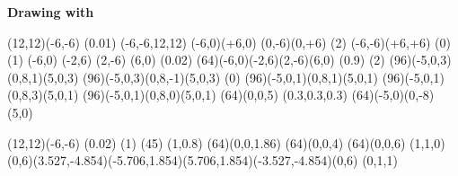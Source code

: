 



\begin{center}
{\Huge \bf{Drawing with \Lapdf}}
\bigskip

\begin{lapdf}(12,12)(-6,-6)
 \Setwidth(0.01)
 \Rect(-6,-6,12,12)
 \Line(-6,0)(+6,0) \Stroke
 \Line(0,-6)(0,+6) \Stroke
 \Dash(2)
 \Line(-6,-6)(+6,+6) \Stroke
 \Dash(0)
 \Gsave
  \Dash(1)
  \Moveto(-6,0)
  \Lineto(-2,6)
  \Lineto(2,-6)
  \Lineto(6,0) \Stroke
 \Grestore
 \Setwidth(0.02)
 \Red
 \Curve(64)(-6,0)(-2,6)(2,-6)(6,0) \Closepath \Gfill(0.9)
 \Cyan
 \Dash(2)
 \Rcurve(96)(-5,0,3)(0,8,1)(5,0,3) \Stroke
 \Rcurve(96)(-5,0,3)(0,8,-1)(5,0,3) \Stroke
 \Dash(0)
 \Green
 \Rcurve(96)(-5,0,1)(0,8,1)(5,0,1) \Stroke
 \Yellow
 \Rcurve(96)(-5,0,1)(0,8,3)(5,0,1) \Stroke
 \Rcurve(96)(-5,0,1)(0,8,0)(5,0,1) \Stroke
 \Magenta
 \Circle(64)(0,0,5) \Stroke
 \Setcol(0.3,0.3,0.3)
 \Curve(64)(-5,0)(0,-8)(5,0) \Stroke
\end{lapdf}
\bigskip

\begin{lapdf}(12,12)(-6,-6)
 \Setwidth(0.02)
 \Setjoin(1)
 \Red
 \Rotate(45)
 \Scale(1,0.8)
 \Circle(64)(0,0,1.86)
 \Circle(64)(0,0,4)
 \Circle(64)(0,0,6)
 \Fill(1,1,0)
 \Polygon(0,6)(3.527,-4.854)(-5.706,1.854)(5.706,1.854)(-3.527,-4.854)(0,6)
 \Fill(0,1,1)
\end{lapdf}
\end{center}

